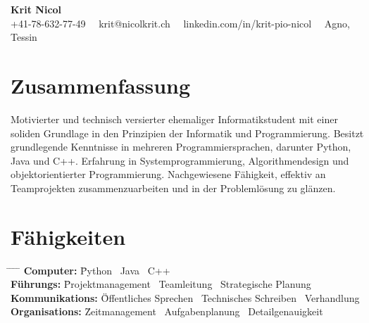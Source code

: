 \documentclass[a4paper,11pt]{article}  %
\begin{document}
\begin{center}
    {\fontsize{18pt}{22pt}\selectfont \textbf{Krit Nicol}} \\
    \vspace{0.2in}
    +41-78-632-77-49 \, \textbullet \, krit@nicolkrit.ch \, \textbullet \, linkedin.com/in/krit-pio-nicol \, \textbullet \, Agno, Tessin \\
\end{center}

\vspace{0.2in}

\section*{Zusammenfassung}
Motivierter und technisch versierter ehemaliger Informatikstudent mit einer soliden Grundlage in den Prinzipien der Informatik und Programmierung. 
Besitzt grundlegende Kenntnisse in mehreren Programmiersprachen, darunter Python, Java und C++. 
Erfahrung in Systemprogrammierung, Algorithmendesign und objektorientierter Programmierung. 
Nachgewiesene Fähigkeit, effektiv an Teamprojekten zusammenzuarbeiten und in der Problemlösung zu glänzen. 
\vspace{0.2in}

\section*{Fähigkeiten}
\begin{tabbing}
    \hspace{1in} \= \hspace{1in} \= \hspace{1in} \= \hspace{1in} \= \kill
    \textbf{Computer:} \= Python \textbullet \, Java \textbullet \, C++ \\
    \textbf{Führungs:} \= Projektmanagement \textbullet \, Teamleitung \textbullet \, Strategische Planung \\
    \textbf{Kommunikations:} \= Öffentliches Sprechen \textbullet \, Technisches Schreiben \textbullet \, Verhandlung \\
    \textbf{Organisations:} \= Zeitmanagement \textbullet \, Aufgabenplanung \textbullet \, Detailgenauigkeit \\
\end{tabbing}
\end{document}
